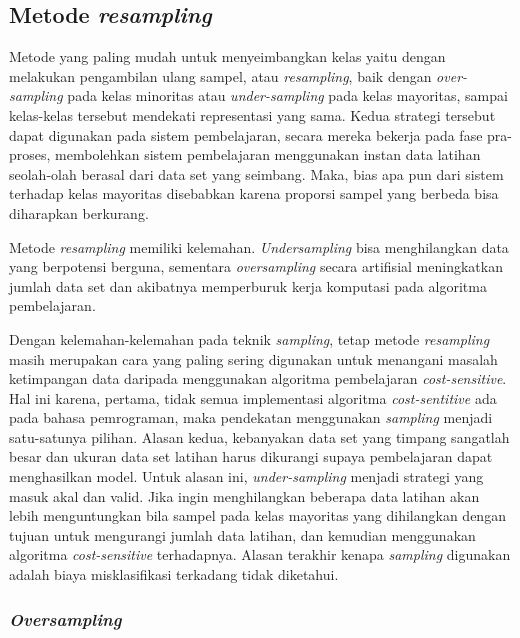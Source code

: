 \documentclass[12pt,a4paper,titlepage]{article}
\begin{document}
\subsection{Metode \textit{resampling}}\label{subsec:metode-resampling}

Metode yang paling mudah untuk menyeimbangkan kelas yaitu dengan melakukan pengambilan ulang sampel, atau \textit{resampling}, baik dengan \linebreak \textit{over-sampling} pada kelas minoritas atau \textit{under-sampling} pada kelas mayoritas, sampai kelas-kelas tersebut mendekati representasi yang sama.
Kedua strategi tersebut dapat digunakan pada sistem pembelajaran, secara mereka bekerja pada fase pra-proses, membolehkan sistem pembelajaran menggunakan instan data latihan seolah-olah berasal dari data set yang seimbang. 
Maka, bias apa pun dari sistem terhadap kelas mayoritas disebabkan karena proporsi sampel yang berbeda bisa diharapkan berkurang.

Metode \textit{resampling} memiliki kelemahan.
\textit{Undersampling} bisa menghilangkan data yang berpotensi berguna, sementara \textit{oversampling} secara artifisial meningkatkan jumlah data set dan akibatnya memperburuk kerja komputasi pada algoritma pembelajaran.

Dengan kelemahan-kelemahan pada teknik \textit{sampling}, tetap metode \textit{resampling} masih merupakan cara yang paling sering digunakan untuk menangani masalah ketimpangan data daripada menggunakan algoritma pembelajaran \textit{cost-sensitive}.
Hal ini karena, pertama, tidak semua implementasi algoritma \textit{cost-sentitive} ada pada bahasa pemrograman, maka pendekatan menggunakan \textit{sampling} menjadi satu-satunya pilihan.
Alasan kedua, kebanyakan data set yang timpang sangatlah besar dan ukuran data set latihan harus dikurangi supaya pembelajaran dapat menghasilkan model.
Untuk alasan ini, \textit{under-sampling} menjadi strategi yang masuk akal dan valid.
Jika ingin menghilangkan beberapa data latihan akan lebih menguntungkan bila sampel pada kelas mayoritas yang dihilangkan dengan tujuan untuk mengurangi jumlah data latihan, dan kemudian menggunakan algoritma \textit{cost-sensitive} terhadapnya.
Alasan terakhir kenapa \textit{sampling} digunakan adalah biaya misklasifikasi terkadang tidak diketahui.

\subsubsection{\textit{Oversampling}}\label{subsubsec:oversampling}
\end{document}
